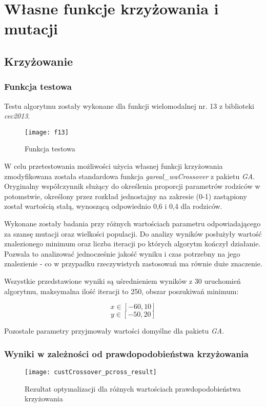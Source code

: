 \section{Własne funkcje krzyżowania i mutacji}

\subsection{Krzyżowanie}

\subsubsection{Funkcja testowa}
Testu algorytmu zostały wykonane dla funkcji wielomodalnej nr. 13 z biblioteki \textit{cec2013}.

\begin{figure}[H]
	\centering
	\texttt{[image: f13]}
	\caption{Funkcja testowa}
\end{figure}

W celu przetestowania możliwości użycia własnej funkcji krzyżowania zmodyfikowana została standardowa funkcja \textit{gareal\_waCrossover} z pakietu \textit{GA}.
Oryginalny współczynnik służący do określenia proporcji parametrów rodziców w potomstwie, określony przez rozkład jednostajny na zakresie (0-1) zastąpiony został wartością stałą, wynoszącą odpowiednio 0,6 i 0,4 dla rodziców. 

Wykonane zostały badania przy różnych wartościach parametru odpowiadającego za szansę mutacji oraz wielkości populacji. Do analizy wyników posłużyły wartość znalezionego minimum oraz liczba iteracji po których algorytm kończył działanie. Pozwala to analizować jednocześnie jakość wyniku i czas potrzebny na jego znalezienie - co w przypadku rzeczywistych zastosowań ma równie duże znaczenie.

Wszystkie przedstawione wyniki są uśrednieniem wyników z 30 uruchomień algorytmu, maksymalna ilość iteracji to 250, obszar poszukiwań minimum:

\begin{equation}
x\in [-60, 10] 
\nonumber
\end{equation}
\begin{equation}
y\in [-50, 20]
\nonumber
\end{equation}

Pozostałe parametry przyjmowały wartości domyślne dla pakietu \textit{GA}.
\subsubsection{Wyniki w zależności od prawdopodobieństwa krzyżowania}
\begin{figure}[H]
	\centering
	\texttt{[image: custCrossover\_pcross\_result]}
	\caption{Rezultat optymalizacji dla różnych wartościach prawdopodobieństwa krzyżowania}

\end{figure}

